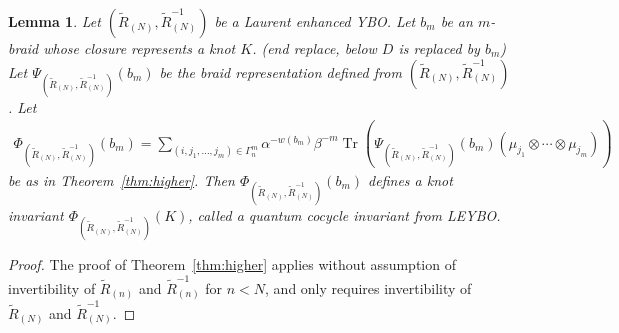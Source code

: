 \documentclass[11pt,fleqn]{amsart} %
\DeclareMathOperator{\tr}{Tr}
\newtheorem{lemma}[theorem]{Lemma}
\begin{document}
\begin{lemma}\label{lem:LEYBOinv}
Let 
 $(\tilde R_{(N)}, \tilde R^{-1}_{(N)})$ be a Laurent enhanced YBO. 
 Let $b_m$ be an $m$-braid whose closure represents a knot $K$. (end replace, below $D$ is replaced by $b_m$) 
Let $\Psi_{(\tilde R_{(N)}, \tilde R^{-1}_{(N)}) } (b_m)$ be the braid representation defined from 
 $(\tilde R_{(N)}, \tilde R^{-1}_{(N)})$.
Let 
\begin{eqnarray*}
				\Phi_{(\tilde R_{(N)}, \tilde R^{-1}_{(N)})}(b_m) = 	\sum_{(i,j_1,\ldots,j_m)\in \Gamma^m_n}  \alpha^{-w(b_m)}\beta^{-m}\tr(\Psi_{(\tilde R_{(N)}, \tilde R^{-1}_{(N)})  }(b_m)(\mu_{j_1}\otimes \cdots \otimes \mu_{j_m}))
		\end{eqnarray*}
be as in Theorem~\ref{thm:higher}.
 Then $\Phi_{(\tilde R_{(N)}, \tilde R^{-1}_{(N)}) }(b_m) $ defines a knot invariant $\Phi_{(\tilde R_{(N)}, \tilde R^{-1}_{(N)}) }(K) $,  called a {\it quantum cocycle invariant from LEYBO}.
\end{lemma}

\begin{proof}
The proof of Theorem~\ref{thm:higher} applies without assumption of invertibility of
$\tilde R_{(n)}$ and $\tilde R^{-1}_{(n)}$ for $n < N$, and only requires invertibility of 
$\tilde R_{(N)}$ and $\tilde R^{-1}_{(N)}$. 
\end{proof}
\end{document}
